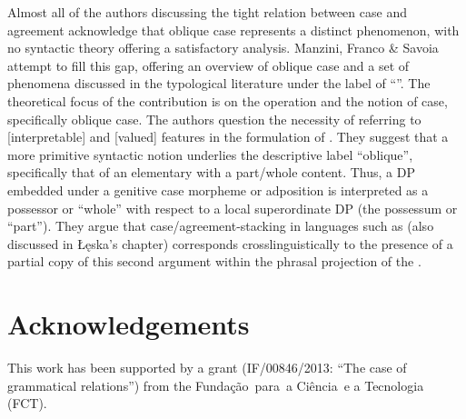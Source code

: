 \documentclass[output=paper]{langsci/langscibook}
\begin{document}
Almost all of the authors discussing the tight relation between case and agreement acknowledge that oblique case represents a distinct phenomenon, with no syntactic theory offering a satisfactory analysis. Manzini, Franco \& Savoia attempt to fill this gap, offering an overview of oblique case and a set of phenomena discussed in the typological literature under the label of ``''. The theoretical focus of the contribution is on the  operation  and the notion of case, specifically oblique case. The authors question the necessity of referring to [interpretable] and [valued] features in the formulation of . They suggest that a more primitive syntactic notion underlies the descriptive label ``oblique'', specifically that of an elementary  with a part\slash whole content. Thus, a DP embedded under a genitive case morpheme or adposition is interpreted as a possessor or ``whole'' with respect to a local superordinate DP (the possessum or ``part''). They argue that case\slash agreement-stacking in languages such as  (also discussed in Łęska’s chapter) corresponds crosslinguistically to the presence of a partial copy of this second argument within the phrasal projection of the .

\section*{Acknowledgements}
This work has been supported by a grant (IF/00846/2013: ``The case of grammatical relations'') from the Fundação~para~a Ciência~e a Tecnologia (FCT).

{\sloppy\printbibliography[heading=subbibliography,notkeyword=this] }
\end{document}
